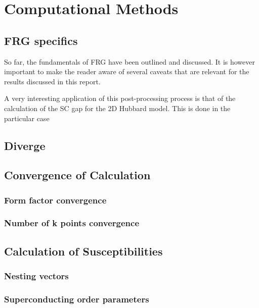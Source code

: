 \documentclass[12pt]{article}
\begin{document}
\section{Computational Methods}

\subsection{FRG specifics}

\noindent So far, the fundamentals of FRG have been outlined and discussed. It is however important to make 
the reader aware of several caveats that are relevant for the results discussed in this report. 



A very interesting application of this post-processing process is that of the calculation of the SC gap for the 2D Hubbard model. 
This is done in the particular case 

\subsection{Diverge}

\subsection{Convergence of Calculation}
\label{subsec:convergence}

\subsubsection{Form factor convergence}

\subsubsection{Number of k points convergence }

\subsection{Calculation of Susceptibilities}

\subsubsection{Nesting vectors}

\subsubsection{Superconducting order parameters}
\end{document}
